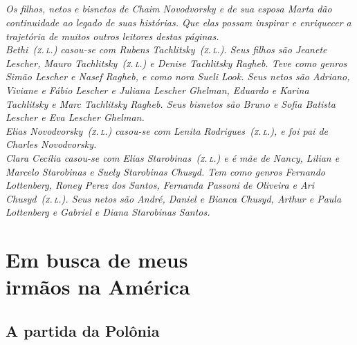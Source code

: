\chapter*{}
\thispagestyle{empty}

\vfill
\begin{flushright}
\footnotesize
\textit{Os filhos, netos e bisnetos de Chaim Novodvorsky e de sua esposa Marta dão continuidade ao legado de suas histórias. Que elas possam inspirar e enriquecer a trajetória de muitos outros leitores destas páginas.\\
\medskip
Bethi~(\textsc{z.\,l.}) casou-se com Rubens Tachlitsky~(\textsc{z.\,l.}). Seus filhos são Jeanete Lescher, Mauro Tachlitsky~(\textsc{z.\,l.}) e Denise Tachlitsky Ragheb. Teve como genros Simão Lescher e Nasef Ragheb, e como nora Sueli Look. Seus netos são Adriano, Viviane e Fábio Lescher e Juliana Lescher Ghelman, Eduardo e Karina Tachlitsky e Marc Tachlitsky Ragheb. Seus bisnetos são Bruno e Sofia Batista Lescher e Eva Lescher Ghelman.\\
\smallskip
Elias Novodvorsky~(\textsc{z.\,l.}) casou-se com Lenita Rodrigues~(\textsc{z.\,l.}), e foi pai de Charles Novodvorsky.\\
\smallskip
Clara Cecília casou-se com Elias Starobinas~(\textsc{z.\,l.}) e é mãe de Nancy, Lilian e Marcelo Starobinas e Suely Starobinas Chusyd. Tem como genros Fernando Lottenberg, Roney Perez dos Santos, Fernanda Passoni de Oliveira e Ari Chusyd~(\textsc{z.\,l.}). Seus netos são André, Daniel e Bianca Chusyd, Arthur e Paula Lottenberg e Gabriel e Diana Starobinas Santos.}
\end{flushright}

\part[Em busca de meus irmãos na América]{Em busca de meus\\irmãos na América}

\chapter{A partida da Polônia}

\textit{}

